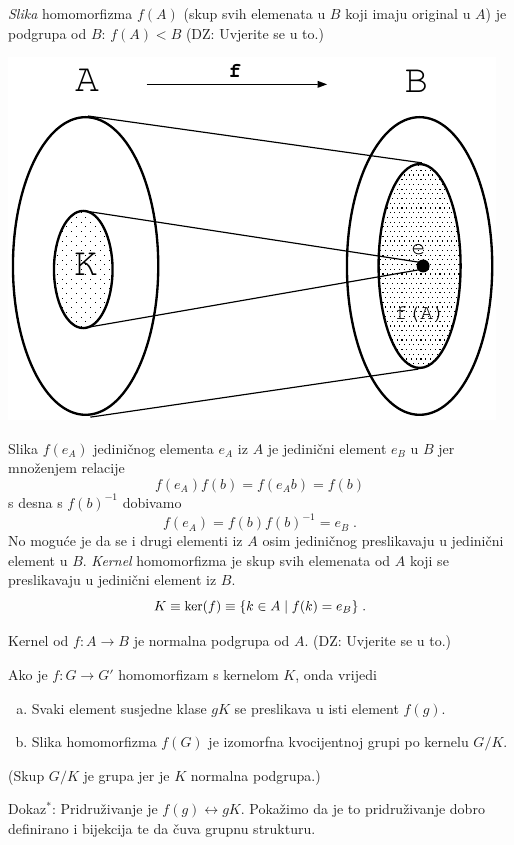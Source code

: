 \emph{Slika} homomorfizma $f(A)$ (skup svih elemenata u $B$ koji imaju original u $A$) 
je podgrupa od $B$: $f(A)< B$ (DZ: Uvjerite se u to.)

\centerline{\includegraphics[scale=0.8]{pics/homomorfizam}}

Slika $f(e_A)$ jediničnog elementa $e_A$ iz $A$ je jedinični element $e_B$ u $B$ jer
množenjem relacije
$$ f(e_A) f(b) = f(e_A b) = f(b) $$
s desna s $f(b)^{-1}$ dobivamo
$$ f(e_A) = f(b) f(b)^{-1} = e_B \;. $$
No moguće je da se i drugi elementi iz $A$ osim jediničnog preslikavaju u 
jedinični element u $B$.
\emph{Kernel} homomorfizma je skup svih elemenata od $A$ koji se
preslikavaju u jedinični element iz $B$.
$$ K \equiv {\rm ker}(f) \equiv \{ k\in A \; | \; f(k) = e_B \} \;. $$

Kernel od $f:A\to B$ je normalna podgrupa od $A$. (DZ: Uvjerite se u to.)


\begin{teorem}
\label{th:izomorfizam}
Ako je $f:G\to G'$ homomorfizam s kernelom $K$, onda vrijedi
\begin{enumerate}[a)]
\item Svaki element susjedne klase $gK$ se preslikava u isti element $f(g)$.
\item Slika homomorfizma $f(G)$ je izomorfna kvocijentnoj grupi po kernelu $G/K$.
\end{enumerate}
\end{teorem}
(Skup $G/K$ je grupa jer je $K$ normalna podgrupa.)

Dokaz$^{*}$: Pridruživanje je $f(g)\leftrightarrow gK$.
Pokažimo da je to pridruživanje dobro definirano i bijekcija te da čuva grupnu
strukturu.

